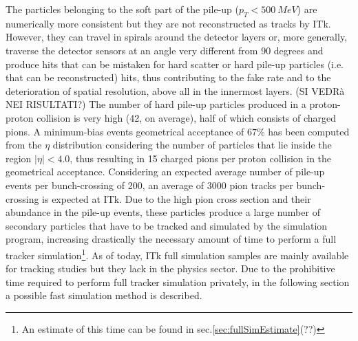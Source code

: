 \documentclass[a4paper,twoside,12pt]{article}
\begin{document}

The particles belonging to the soft part of the pile-up ($p_{T} < 500\ MeV$) are numerically more consistent but 
they are not reconstructed as tracks by ITk. However, they can travel in spirals around the 
detector layers or, more generally, traverse the detector sensors at an angle very different
from 90 degrees and produce hits that can be mistaken for hard scatter or hard pile-up particles
(i.e. that can be reconstructed) hits, thus contributing to the fake rate and to the
deterioration of spatial resolution, above all in the innermost layers. (SI VEDRà NEI RISULTATI?)
The number of hard pile-up particles produced in a proton-proton collision is very high (42, on average), 
half of which consists of charged pions. A minimum-bias events geometrical acceptance of $67\%$ has 
been computed from the $\eta$ distribution considering the number of particles that 
lie inside the region $|\eta| < 4.0$, thus resulting in 15 charged pions per proton collision in 
the geometrical acceptance. Considering an expected average number of pile-up events per bunch-crossing of 200, an average of 3000 pion tracks per bunch-crossing is expected at ITk.
Due to the high pion cross section and their abundance in the pile-up events, these particles produce
a large number of secondary particles that have to be tracked and simulated by the simulation
program, increasing drastically the necessary amount of time to perform a full tracker simulation\footnote{An estimate of this time can be found in sec.\ref{sec:fullSimEstimate}(??)}. As of today, ITk full simulation samples are mainly available for tracking studies but they
lack in the physics sector. Due to the prohibitive time required to perform full tracker 
simulation privately, in the following section a possible fast simulation method is described.
\end{document}
